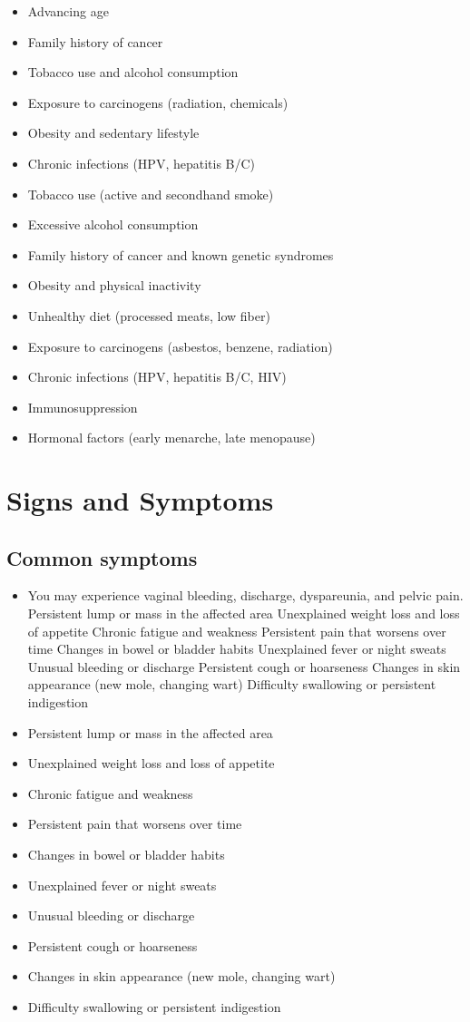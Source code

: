 \begin{itemize}[noitemsep]
  \item Advancing age
  \item Family history of cancer
  \item Tobacco use and alcohol consumption
  \item Exposure to carcinogens (radiation, chemicals)
  \item Obesity and sedentary lifestyle
  \item Chronic infections (HPV, hepatitis B/C)
  \item Tobacco use (active and secondhand smoke)
  \item Excessive alcohol consumption
  \item Family history of cancer and known genetic syndromes
  \item Obesity and physical inactivity
  \item Unhealthy diet (processed meats, low fiber)
  \item Exposure to carcinogens (asbestos, benzene, radiation)
  \item Chronic infections (HPV, hepatitis B/C, HIV)
  \item Immunosuppression
  \item Hormonal factors (early menarche, late menopause)
\end{itemize}
\section{Signs and Symptoms}

\subsection{Common symptoms}
\begin{itemize}[noitemsep]
  \item You may experience vaginal bleeding, discharge, dyspareunia, and pelvic pain. Persistent lump or mass in the affected area Unexplained weight loss and loss of appetite Chronic fatigue and weakness Persistent pain that worsens over time Changes in bowel or bladder habits Unexplained fever or night sweats Unusual bleeding or discharge Persistent cough or hoarseness Changes in skin appearance (new mole, changing wart) Difficulty swallowing or persistent indigestion
  \item Persistent lump or mass in the affected area
  \item Unexplained weight loss and loss of appetite
  \item Chronic fatigue and weakness
  \item Persistent pain that worsens over time
  \item Changes in bowel or bladder habits
  \item Unexplained fever or night sweats
  \item Unusual bleeding or discharge
  \item Persistent cough or hoarseness
  \item Changes in skin appearance (new mole, changing wart)
  \item Difficulty swallowing or persistent indigestion
\end{itemize}

